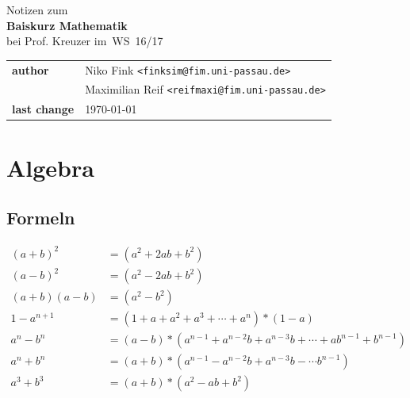 \documentclass[a4paper,10pt]{article}
\begin{document}
\begin{titlepage}
	\begin{center}
		\huge Notizen zum \\
		\Huge \textbf{Baiskurz Mathematik} \\
		\huge bei Prof. Kreuzer im WS 16/17 \\
		\normalsize

		\vspace{1cm}
		\begin{tabular}[b]{l|l}
			\textbf{author} & Niko Fink \texttt{<finksim@fim.uni-passau.de>} \\
							& Maximilian Reif \texttt{<reifmaxi@fim.uni-passau.de>} \\
			\textbf{last change} & \today
		\end{tabular}

		\vspace{1cm}
		\tableofcontents
	\end{center}
\end{titlepage}

\section{Algebra}

\subsection{Formeln}
\begin{align}
(a+b)^2 &= (a^2 + 2ab + b^2) \tag{1. binomische Formel} \\
(a-b)^2 &= (a^2 - 2ab + b^2) \tag{2. binomische Formel} \\
(a+b)(a-b) &= (a^2 - b^2) \tag{3. binomische Formel} \\
1-a^{n+1} &= (1 + a + a^2 + a^3 + \cdots + a^n) * (1-a) \tag{Teleskopsumme} \\
a^n - b^n &= (a-b) * (a^{n-1} + a^{n-2} b + a^{n-3} b + \cdots + ab^{n-1} +b^{n-1}) \\
a^n + b^n &= (a+b) * (a^{n-1} - a^{n-2} b + a^{n-3} b - \cdots b^{n-1}) \\
a^3 + b^3 &= (a+b) * (a^2 - ab + b^2)
\end{align}
\end{document}
